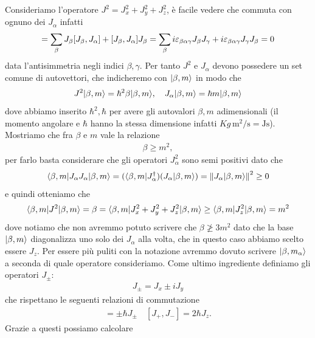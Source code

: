 Consideriamo l'operatore $ J^2 = J_x^2 + J_y^2 + J_z^2 $, è facile vedere che commuta con ognuno dei $ J_\alpha $ infatti 
\begin{align*}
  [J^2, J_\alpha] = \sum_\beta J_\beta[J_\beta, J_\alpha] + [J_\beta,J_\alpha] J_\beta 
  = \sum_\beta i  \eps_{\beta \alpha \gamma} J_\beta J_\gamma + i \eps_{\beta \alpha \gamma} J_\gamma J_\beta = 0
\end{align*}
data l'antisimmetria negli indici $ \beta, \gamma $. Per tanto $ J^2 $ e $ J_\alpha $ devono possedere un set comune di autovettori, che indicheremo con 
$ \vert \beta , m \rangle $ in modo che 
\begin{align*}
  J^2 \vert \beta, m \rangle = \hbar^2 \beta \vert \beta,m \rangle, \quad J_\alpha \vert \beta, m \rangle = \hbar m \vert \beta,m \rangle
\end{align*}
dove abbiamo inserito $ \hbar^2, \hbar $ per avere gli autovalori $ \beta,m $ adimensionali (il momento angolare e $ \hbar $ hanno la stessa dimensione 
infatti $ \si{Kg \, \meter^2 / \second } = \si{\joule \second} $). Mostriamo che fra $ \beta $ e $ m $ vale la relazione 
\begin{align*}
  \beta \geq m^2,
\end{align*}
per farlo basta considerare che gli operatori $ J_\alpha^2 $ sono semi positivi dato che 
\begin{align*}
  \langle \beta,m | J_\alpha J_\alpha | \beta,m \rangle = (\langle \beta,m \vert J_\alpha^\dag ) (J_\alpha \vert \beta,m \rangle) = \left\lVert J_\alpha \vert \beta,m \rangle \right\rVert^2 \geq 0
\end{align*}
e quindi otteniamo che 
\begin{align*}
  \langle \beta,m | J^2 | \beta,m \rangle = \beta = \langle \beta,m | J_x^2 + J_y^2 + J_z^2 | \beta,m \rangle \geq \langle \beta,m | J_z^2 | \beta,m \rangle = m^2
\end{align*}
dove notiamo che non avremmo potuto scrivere che $ \beta \not \geq 3m^2 $ dato che la base $ \vert \beta,m \rangle $ diagonalizza uno solo dei $ J_\alpha $ 
alla volta, che in questo caso abbiamo scelto essere $ J_z $. Per essere più puliti con la notazione avremmo dovuto scrivere $ \vert \beta,m_\alpha \rangle $ a 
seconda di quale operatore consideriamo. Come ultimo ingrediente definiamo gli operatori $ J_\pm $:
\begin{align*}
  J_\pm = J_x \pm iJ_y
\end{align*}
che rispettano le seguenti relazioni di commutazione 
\begin{align*}
  [J_z, J_\pm] = \pm \hbar J_\pm \quad [J_+, J_-] = 2\hbar J_z.
\end{align*}
Grazie a questi possiamo calcolare 
